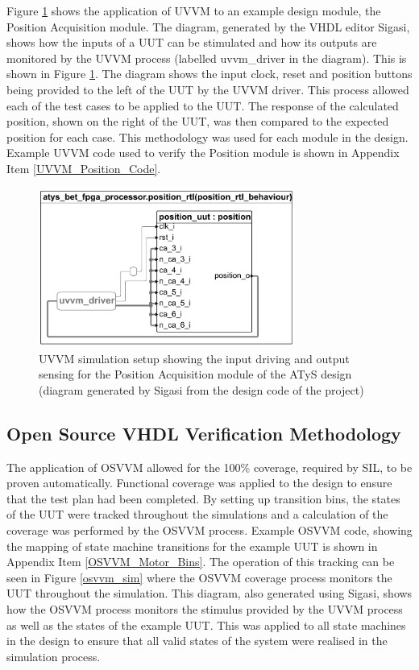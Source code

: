 Figure \ref{position_uvvm} shows the application of UVVM to an example design module, the Position Acquisition module. The diagram, generated by the VHDL editor Sigasi, shows how the inputs of a UUT can be stimulated and how its outputs are monitored by the UVVM process (labelled uvvm\_driver in the diagram). This is shown in Figure \ref{position_uvvm}. The diagram shows the input clock, reset and position buttons being provided to the left of the UUT by the UVVM driver. This process allowed each of the test cases to be applied to the UUT. The response of the calculated position, shown on the right of the UUT, was then compared to the expected position for each case. This methodology was used for each module in the design. Example UVVM code used to verify the Position module is shown in Appendix Item \ref{UVVM_Position_Code}.

\begin{figure}[h]
\centering
\includegraphics[width=0.75\textwidth]{images/uvvmblockdiagram.pdf}
\caption{UVVM simulation setup showing the input driving and output sensing for the Position Acquisition module of the ATyS design (diagram generated by Sigasi from the design code of the project)}
\label{position_uvvm}
\end{figure}



\subsection{Open Source VHDL Verification Methodology}

The application of OSVVM allowed for the 100\% coverage, required by SIL, to be proven automatically. Functional coverage was applied to the design to ensure that the test plan had been completed. By setting up transition bins, the states of the UUT were tracked throughout the simulations and a calculation of the coverage was performed by the OSVVM process. Example OSVVM code, showing the mapping of state machine transitions for the example UUT is shown in Appendix Item \ref{OSVVM_Motor_Bins}. The operation of this tracking can be seen in Figure \ref{osvvm_sim} where the OSVVM coverage process monitors the UUT throughout the simulation. This diagram, also generated using Sigasi, shows how the OSVVM process monitors the stimulus provided by the UVVM process as well as the states of the example UUT. This was applied to all state machines in the design to ensure that all valid states of the system were realised in the simulation process.

